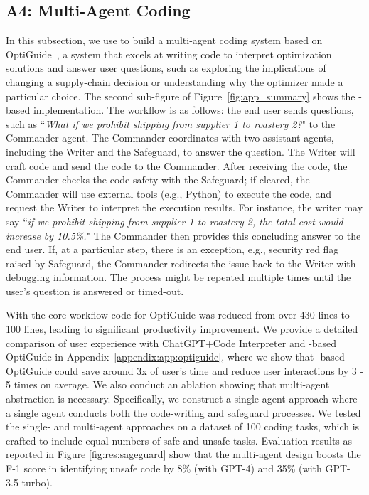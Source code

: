 \subsection*{A4: Multi-Agent Coding}
\label{sec:app:optiguide}

In this subsection, we use \libName to build a multi-agent coding system based on OptiGuide~\cite{li2023large}, a system that excels at writing code to interpret optimization solutions and answer user questions, such as exploring the implications of changing a supply-chain decision or understanding why the optimizer made a particular choice. 
The second sub-figure of Figure~\ref{fig:app_summary} shows the \libName-based implementation.  The workflow is as follows:
the end user sends questions, such as ``\emph{What if we prohibit shipping from supplier 1 to roastery 2?}" to the Commander agent.  
The Commander coordinates with two assistant agents, including the Writer and the Safeguard, to answer the question. The Writer will craft code 
and send the code to the Commander. 
After receiving the code, the Commander checks the code safety with the Safeguard; if cleared, the Commander will use external tools (e.g., Python) to execute the code, and request the Writer to interpret the execution results. For instance, the writer may say ``\emph{if we prohibit shipping from supplier 1 to roastery 2, the total cost would increase by 10.5\%.}" The Commander then provides this concluding answer to the end user.  If, at a particular step, there is an exception, e.g., security red flag raised by Safeguard, the Commander redirects the issue back to the Writer with debugging information.
The process might be repeated multiple times until the user's question is answered or timed-out. 

With \libName the core workflow code for OptiGuide was reduced from over 430 lines to 100 lines, leading to significant productivity improvement. We provide a detailed comparison of user experience with ChatGPT+Code Interpreter and \libName-based OptiGuide in Appendix~\ref{appendix:app:optiguide}, where we show that \libName-based OptiGuide could save around 3x of user's time and reduce user interactions by 3 - 5 times on average.  We also conduct an ablation showing that multi-agent abstraction is necessary. Specifically, we construct a single-agent approach where a single agent conducts both the code-writing and safeguard processes. We tested the single- and multi-agent approaches on a dataset of 100 coding tasks, which is crafted to include equal numbers of safe and unsafe tasks.
Evaluation results as reported in Figure \ref{fig:res:sageguard}
show that the multi-agent design boosts the F-1 score in identifying unsafe code by 8\% (with GPT-4) and 35\% (with GPT-3.5-turbo). 

